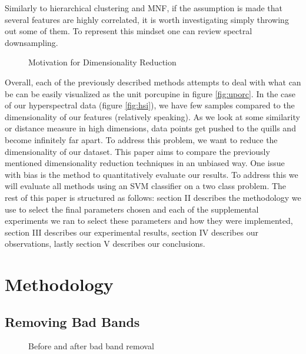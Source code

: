 \documentclass[conference,onecolumn]{IEEEtran}
\begin{document}
Similarly to hierarchical clustering and MNF, if the assumption is made that several features are highly correlated, it is worth investigating simply throwing out some of them. To represent this mindset one can review spectral downsampling. 

\begin{figure}[H]
	\centering
\qquad
\caption{Motivation for Dimensionality Reduction}
\end{figure}
 
 Overall, each of the previously described methods attempts to deal with what can be can be easily visualized as the unit porcupine in figure \ref{fig:uporc}. In the case of our hyperspectral data (figure \ref{fig:hsi}), we have few samples compared to the dimensionality of our features (relatively speaking). As we look at some similarity or distance measure in high dimensions, data points get pushed to the quills and become infinitely far apart. To address this problem, we want to reduce the dimensionality of our dataset. This paper aims to compare the previously mentioned dimensionality reduction techniques in an unbiased way. One issue with bias is the method to quantitatively evaluate our results. To address this we will evaluate all methods using an SVM classifier on a two class problem. The rest of this paper is structured as follows: section II describes the methodology we use to select the final parameters chosen and each of the supplemental experiments we ran to select these parameters and how they were implemented, section III describes our experimental results, section IV describes our observations, lastly section V describes our conclusions. 
\section{Methodology}

\subsection{Removing Bad Bands}

\begin{figure}[H]
	\centering
	\qquad
	\caption{Before and after bad band removal}
\end{figure}
\end{document}
